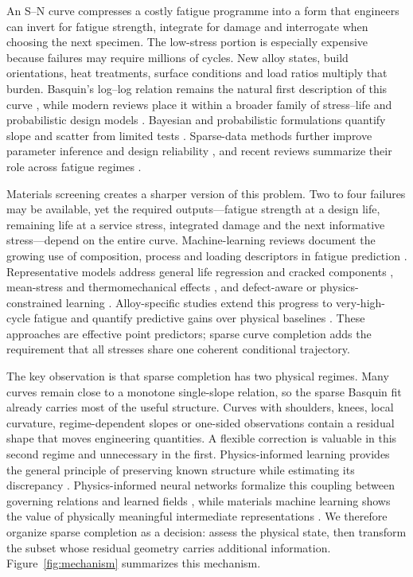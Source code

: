 \documentclass[a4paper,fleqn]{cas-dc}
\begin{document}
An S--N curve compresses a costly fatigue programme into a form that engineers can invert for fatigue strength, integrate for damage and interrogate when choosing the next specimen. The low-stress portion is especially expensive because failures may require millions of cycles. New alloy states, build orientations, heat treatments, surface conditions and load ratios multiply that burden. Basquin's log--log relation remains the natural first description of this curve \cite{Basquin1910}, while modern reviews place it within a broader family of stress--life and probabilistic design models \cite{Santecchia2018FatigueReview,Tridello2022PSNReview}. Bayesian and probabilistic formulations quantify slope and scatter from limited tests \cite{Li2020PSNInference,Barbosa2019ProbabilisticSN}. Sparse-data methods further improve parameter inference and design reliability \cite{Zhao2020SparseBayesianSN,Zhao2023BayesianSN}, and recent reviews summarize their role across fatigue regimes \cite{Kufoin2024ProbabilisticReview}.

Materials screening creates a sharper version of this problem. Two to four failures may be available, yet the required outputs---fatigue strength at a design life, remaining life at a service stress, integrated damage and the next informative stress---depend on the entire curve. Machine-learning reviews document the growing use of composition, process and loading descriptors in fatigue prediction \cite{Mirzaei2025MLReview,Reddy2025FatigueMLReview}. Representative models address general life regression and cracked components \cite{Prajapati2022AIFatigue,Wang2022CrackedML}, mean-stress and thermomechanical effects \cite{Zhu2022MeanStressML,Schafer2022TMFML}, and defect-aware or physics-constrained learning \cite{Salvati2022DefectPIML,Li2025HybridHCF}. Alloy-specific studies extend this progress to very-high-cycle fatigue and quantify predictive gains over physical baselines \cite{Shi2023VHCF,Wu2027PredictiveGain}. These approaches are effective point predictors; sparse curve completion adds the requirement that all stresses share one coherent conditional trajectory.

The key observation is that sparse completion has two physical regimes. Many curves remain close to a monotone single-slope relation, so the sparse Basquin fit already carries most of the useful structure. Curves with shoulders, knees, local curvature, regime-dependent slopes or one-sided observations contain a residual shape that moves engineering quantities. A flexible correction is valuable in this second regime and unnecessary in the first. Physics-informed learning provides the general principle of preserving known structure while estimating its discrepancy \cite{Karniadakis2021PhysicsML}. Physics-informed neural networks formalize this coupling between governing relations and learned fields \cite{Raissi2019PINN}, while materials machine learning shows the value of physically meaningful intermediate representations \cite{Butler2018MaterialsML}. We therefore organize sparse completion as a decision: assess the physical state, then transform the subset whose residual geometry carries additional information. Figure~\ref{fig:mechanism} summarizes this mechanism.
\end{document}
